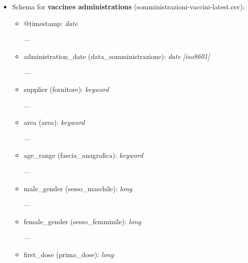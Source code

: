 \documentclass[12pt, a4paper]{article}
\begin{document}
\begin{itemize}
    \item Schema for \textbf{vaccines administrations} 
        (somministrazioni-vaccini-latest.csv):
        \begin{itemize}
            \item @timestamp: \emph{date} \\
            \begin{footnotesize}
                ---
            \end{footnotesize}
            \item administration\_date (data\_somministrazione): \emph{date [iso8601]} \\
                \begin{footnotesize}
                    ---
                \end{footnotesize}
            \item supplier (fornitore): \emph{keyword} \\
                \begin{footnotesize}
                    ---
                \end{footnotesize}
            \item area (area): \emph{keyword} \\
                \begin{footnotesize}
                    ---
                \end{footnotesize}
            \item age\_range (fascia\_anagrafica): \emph{keyword} \\
                \begin{footnotesize}
                    ---
                \end{footnotesize}
            \item male\_gender (sesso\_maschile): \emph{long} \\
                \begin{footnotesize}
                    ---
                \end{footnotesize}
            \item female\_gender (sesso\_femminile): \emph{long} \\
                \begin{footnotesize}
                    ---
                \end{footnotesize}
            \item first\_dose (prima\_dose): \emph{long} \\

\end{itemize}
\end{itemize}
\end{document}
